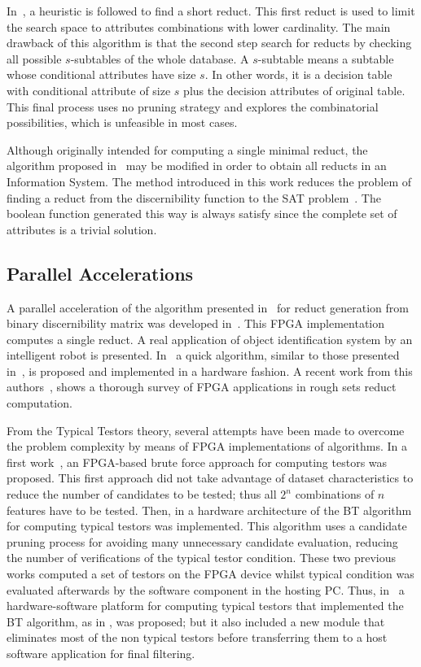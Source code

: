 \documentclass[authoryear,11pt]{elsarticle}
\begin{document}
  
  In~\citep{Lin04}, a heuristic is followed to find a short reduct. This first reduct is used to limit the search
  space to attributes combinations with lower cardinality. The main drawback of this algorithm is that the second
  step search for reducts by checking all possible $s$-subtables of the whole database. A $s$-subtable means a 
  subtable whose conditional attributes have size $s$. In other words, it is a decision table with conditional
  attribute of size $s$ plus the decision attributes of original table. This final process uses no pruning strategy 
  and explores the combinatorial possibilities, which is unfeasible in most cases.
  
  Although originally intended for computing a single minimal reduct, the algorithm proposed in~\citep{Jensen14}
  may be modified in order to obtain all reducts in an Information System. The method introduced in this work
  reduces the problem of finding a reduct from the discernibility function to the SAT problem~\citep{Davis62}. 
  The boolean function generated this way is always satisfy since the complete set of attributes is a trivial
  solution.
  
\subsection{Parallel Accelerations}

  A parallel acceleration of the algorithm presented in~\citep{Yang08} for reduct generation from binary
  discernibility matrix was developed in~\citep{Tiwari11,Tiwari12}. This FPGA implementation computes a 
  single reduct. A real application of object identification system by an intelligent robot is presented.
  In~\citep{Tiwari13} a quick algorithm, similar to those presented in~\citep{Chouchoulas01}, is proposed
  and implemented in a hardware fashion. A recent work from this authors~\citep{Tiwari14}, shows a thorough
  survey of FPGA applications in rough sets reduct computation.

  From the Typical Testors theory, several attempts have been made to overcome the problem 
  complexity by means of FPGA implementations of algorithms. In a first work~\citep{Cumplido06}, an 
  FPGA-based brute force approach for computing testors was proposed. This first approach did 
  not take advantage of dataset characteristics to reduce the number of candidates to be tested; 
  thus all $2^n$ combinations of $n$ features have to be tested. Then, in \citep{Rojas07} a hardware 
  architecture of the BT algorithm for computing typical testors was implemented. 
  This algorithm uses a candidate pruning process for avoiding many unnecessary candidate evaluation, 
  reducing the number of verifications of the typical testor condition. These two previous works computed 
  a set of testors on the FPGA device whilst typical condition was evaluated afterwards by the 
  software component in the hosting PC. Thus, in~\citep{Rojas12} a hardware-software platform for 
  computing typical testors that implemented the BT algorithm, as in \citep{Rojas07}, was proposed; but it also 
  included a new module that eliminates most of the non typical testors before transferring them to 
  a host software application for final filtering. 
	
\end{document}
